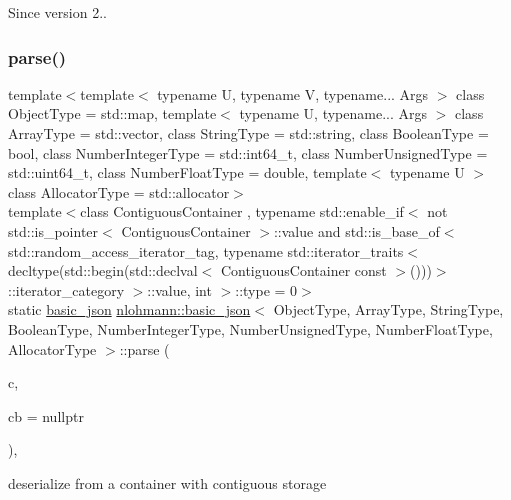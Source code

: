\begin{DoxySince}{Since}
version 2.. 
\end{DoxySince}
\hypertarget{classnlohmann_1_1basic__json_aeffd70f622f8f2a51fd3d95af64b63a7}{}\label{classnlohmann_1_1basic__json_aeffd70f622f8f2a51fd3d95af64b63a7} 
\subsubsection{\texorpdfstring{parse()}{parse()}\hspace{0.1cm}{\footnotesize\ttfamily [6/6]}}
{\footnotesize\ttfamily template$<$template$<$ typename U, typename V, typename... Args $>$ class Object\+Type = std\+::map, template$<$ typename U, typename... Args $>$ class Array\+Type = std\+::vector, class String\+Type  = std\+::string, class Boolean\+Type  = bool, class Number\+Integer\+Type  = std\+::int64\+\_\+t, class Number\+Unsigned\+Type  = std\+::uint64\+\_\+t, class Number\+Float\+Type  = double, template$<$ typename U $>$ class Allocator\+Type = std\+::allocator$>$ \\
template$<$class Contiguous\+Container , typename std\+::enable\+\_\+if$<$ not std\+::is\+\_\+pointer$<$ Contiguous\+Container $>$\+::value and std\+::is\+\_\+base\+\_\+of$<$ std\+::random\+\_\+access\+\_\+iterator\+\_\+tag, typename std\+::iterator\+\_\+traits$<$ decltype(std\+::begin(std\+::declval$<$ Contiguous\+Container const $>$()))$>$\+::iterator\+\_\+category $>$\+::value, int $>$\+::type  = 0$>$ \\
static \hyperlink{classnlohmann_1_1basic__json}{basic\+\_\+json} \hyperlink{classnlohmann_1_1basic__json}{nlohmann\+::basic\+\_\+json}$<$ Object\+Type, Array\+Type, String\+Type, Boolean\+Type, Number\+Integer\+Type, Number\+Unsigned\+Type, Number\+Float\+Type, Allocator\+Type $>$\+::parse (\begin{DoxyParamCaption}\item[{const Contiguous\+Container \&}]{c,  }\item[{const \hyperlink{classnlohmann_1_1basic__json_a9e35475e2027520a78e09f460dbe048a}{parser\+\_\+callback\+\_\+t}}]{cb = {\ttfamily nullptr} }\end{DoxyParamCaption})\hspace{0.3cm}{\ttfamily [inline]}, {\ttfamily [static]}}



deserialize from a container with contiguous storage 

